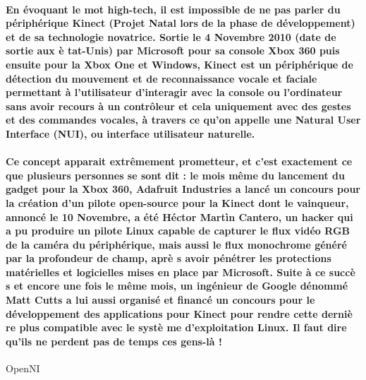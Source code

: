 
\newpage
\vspace{3cm}
 
\NewsItem{\textcolor[rgb]{0.55,0,0}{\huge Kinect et Open Source: Quel avenir ensemble?}}

\paragraph*{En \'evoquant le mot high-tech, il est impossible de ne pas parler du p\'eriph\'erique Kinect (Projet Natal lors de la phase de d\'eveloppement) et de sa technologie novatrice. Sortie le 4 Novembre 2010 (date de sortie aux \`e tat-Unis) par Microsoft pour sa console Xbox 360 puis ensuite pour la Xbox One et Windows, Kinect est un p\'eriph\'erique de d\'etection du mouvement et de reconnaissance vocale et faciale permettant \`a l'utilisateur d'interagir avec la console ou l'ordinateur sans avoir recours \`a un contrôleur et cela uniquement avec des gestes et des commandes vocales, \`a travers ce qu'on appelle une Natural User Interface (NUI), ou interface utilisateur naturelle.}
\paragraph*{Ce concept apparait extr\^emement prometteur, et c'est exactement ce que plusieurs personnes se sont dit : le mois m\^eme du lancement du gadget pour la Xbox 360, Adafruit Industries a lanc\'e un concours pour la cr\'eation d'un pilote open-source pour la Kinect dont le vainqueur, annonc\'e le 10 Novembre, a \'et\'e H\'ector Mart\`in Cantero, un hacker qui a pu produire un pilote Linux capable de capturer le flux vid\'eo RGB de la cam\'era du p\'eriph\'erique, mais aussi le flux monochrome g\'en\'er\'e par la profondeur de champ, apr\`e s avoir p\'en\'etrer les protections mat\'erielles et logicielles mises en place par Microsoft. Suite \`a ce succ\`e s et encore une fois le m\^eme mois, un ing\'enieur de Google d\'enomm\'e Matt Cutts a lui aussi organis\'e et financ\'e un concours pour le d\'eveloppement des applications pour Kinect pour rendre cette derni\`e re plus compatible avec le syst\`e me d'exploitation Linux. Il faut dire qu'ils ne perdent pas de temps ces gens-l\`a !\\}
\textcolor[rgb]{0.55,0,0}{ OpenNI}
